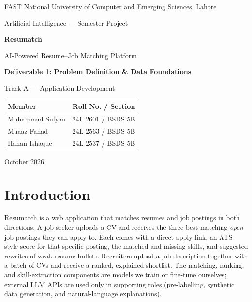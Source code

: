 \documentclass[11pt,a4paper]{article}
\begin{document}
\begin{titlepage}
\centering
{\large FAST National University of Computer and Emerging Sciences, Lahore\par}
\vspace{0.3em}
{\normalsize Artificial Intelligence --- Semester Project\par}
\vspace{4.5em}
{\fontsize{40}{46}\selectfont\bfseries\color{rmblue} Resumatch\par}
\vspace{0.6em}
{\Large AI-Powered Resume--Job Matching Platform\par}
\vspace{3em}
{\large\bfseries Deliverable 1: Problem Definition \& Data Foundations\par}
\vspace{0.4em}
{\normalsize Track A --- Application Development\par}
\vspace{4em}
\begin{tabular}{ll}
\toprule
\textbf{Member} & \textbf{Roll No. / Section}\\
\midrule
Muhammad Sufyan & 24L-2601 / BSDS-5B\\
Muaaz Fahad & 24L-2563 / BSDS-5B\\
Hanan Ishaque & 24L-2537 / BSDS-5B\\
\bottomrule
\end{tabular}
\vfill
{\large October 2026\par}
\end{titlepage}

\tableofcontents
\thispagestyle{fancy}
\newpage

\section{Introduction}
Resumatch is a web application that matches resumes and job postings in both directions.
A job seeker uploads a CV and receives the three best-matching \emph{open} job postings they
can apply to. Each comes with a direct apply link, an ATS-style score for that specific posting,
the matched and missing skills, and suggested rewrites of weak resume bullets. Recruiters upload a job description
together with a batch of CVs and receive a ranked, explained shortlist. The matching, ranking,
and skill-extraction components are models we train or fine-tune ourselves; external LLM APIs
are used only in supporting roles (pre-labelling, synthetic data generation, and
natural-language explanations).
\end{document}
